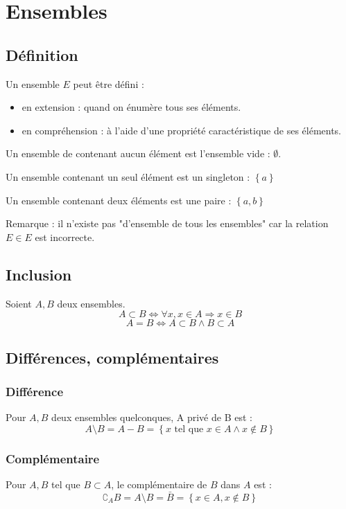 \documentclass[12pt,a4paper,french]{book}
\begin{document}
	\section{Ensembles}
		\subsection{Définition}
		Un ensemble $E$ peut être défini : \begin{itemize}
			\item en extension : quand on énumère tous ses éléments.
			\item en compréhension : à l'aide d'une propriété caractéristique de ses éléments.
		\end{itemize}
		
		Un ensemble de contenant aucun élément est l'ensemble vide : $\emptyset$.
		
		Un ensemble contenant un seul élément est un singleton : $\left\{a\right\}$
		
		Un ensemble contenant deux éléments est une paire : $\left\{a,b\right\}$
		
		Remarque :  il n'existe pas "d'ensemble de tous les ensembles" car la relation $E\in E $ est incorrecte.
		
		\subsection{Inclusion}
			Soient $A,B$ deux ensembles. 
			\[A \subset B \Leftrightarrow \forall x, x \in A \Rightarrow x \in B\]
			\[A = B \Leftrightarrow A \subset B \wedge B \subset A \]
			
		\subsection{Différences, complémentaires}
		
			\subsubsection{Différence}
			Pour $A,B$ deux ensembles quelconques, A privé de B est :
				\[A \setminus B = A-B = \left\{x \mbox{ tel que } x \in A \wedge x \notin B\right\}\]
			\subsubsection{Complémentaire}
			Pour $A,B$ tel que $B \subset A$, le complémentaire de $B$ dans $A$ est :
				\[\complement_A B = A \setminus B = \bar{B} = \left\{x \in A, x\notin B  \right\}\]
\end{document}
